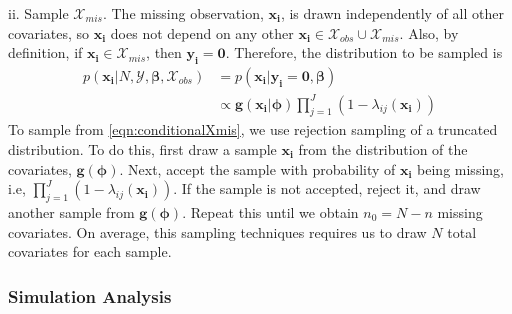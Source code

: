 \documentclass[
  12pt,
]{article}
\begin{document}
\begin{list}{}{}
\begin{list}{}{}
  
  \item[ii.] Sample $\mathcal{X}_{mis}$.   The missing observation, $\boldsymbol{x_i}$, is drawn independently of all other covariates, so $\boldsymbol{x_i}$ does not depend on any other $\boldsymbol{x_i} \in \mathcal{X}_{obs}\cup \mathcal{X}_{mis} $.  Also, by definition, if $\boldsymbol{x_i} \in \mathcal{X}_{mis}$, then $\boldsymbol{y_i} = \boldsymbol{0}$. Therefore, the distribution to be sampled is
  \begin{align}
  \label{eqn:conditionalXmis}
  \nonumber p(\boldsymbol{x_i}|N,\mathcal{Y},\boldsymbol{\beta},\mathcal{X}_{obs})&=p(\boldsymbol{x_i} |\boldsymbol{y_i}=\boldsymbol{0},\boldsymbol{\beta})\\
  &\propto \boldsymbol{g}(\boldsymbol{x_i}|\boldsymbol{\phi})\prod_{j=1}^J (1-\lambda_{ij}(\boldsymbol{x_i}))
  \end{align}
To sample from \autoref{eqn:conditionalXmis}, we use rejection sampling of a truncated distribution.  To do this, first draw a sample $\boldsymbol{x_i}$ from the distribution of the covariates, $\boldsymbol{g}(\boldsymbol{\phi})$. Next, accept the sample with probability of $\boldsymbol{x_i}$ being missing, i.e, $\prod_{j=1}^J (1-\lambda_{ij}(\boldsymbol{x_i}))$.  If the sample is not accepted, reject it, and draw another sample from $\boldsymbol{g}(\boldsymbol{\phi})$. Repeat this until we obtain $n_0 = N - n$ missing covariates.  On average, this sampling techniques requires us to draw $N$ total covariates for each sample.
  
  \end{list}
  
  

\end{list}

\subsubsection{Simulation Analysis}
\label{Sec:simulationanalysis}
\end{document}
